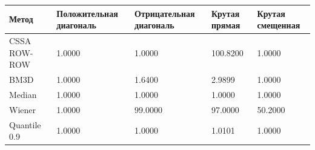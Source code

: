 \begin{tabular}{|l|l|l|l|l|}
\hline
Метод & Положительная диагональ & Отрицательная диагональ & Крутая прямая & Крутая смещенная \\
\hline
CSSA ROW-ROW & 1.0000 & 1.0000 & 100.8200 & 1.0000 \\
\hline
BM3D & 1.0000 & 1.6400 & 2.9899 & 1.0000 \\
\hline
Median & 1.0000 & 1.0000 & 1.0000 & 1.0000 \\
\hline
Wiener & 1.0000 & 99.0000 & 97.0000 & 50.2000 \\
\hline
Quantile 0.9 & 1.0000 & 1.0000 & 1.0101 & 1.0000 \\
\hline
\end{tabular}
